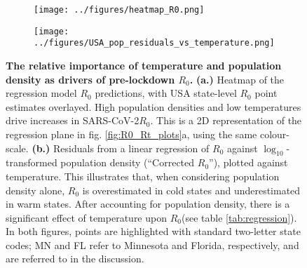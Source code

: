 \documentclass[12pt,english,a4paper]{article}
\newcommand{\virus}{SARS-CoV-2\xspace}
\newcommand{\RO}{$R_0$\xspace}
\begin{document}
\begin{figure}[ht]
\begin{subfigure}{.5\textwidth}
  \centering
  \texttt{[image: ../figures/heatmap\_R0.png]}  
  \caption{}
\end{subfigure}
\begin{subfigure}{.5\textwidth}
  \centering
  \texttt{[image: ../figures/USA\_pop\_residuals\_vs\_temperature.png]}  
  \caption{}
\end{subfigure}
  \caption{ {\bf The relative importance of temperature and population density as drivers of pre-lockdown \RO.}
  {\bf (a.)} Heatmap of the regression model \RO predictions, with USA state-level \RO point estimates overlayed. High population densities and low temperatures drive increases in \virus \RO. This is a 2D representation of the regression plane in fig. \ref{fig:R0_Rt_plots}a, using the same colour-scale.
  {\bf (b.)} Residuals from a linear regression of \RO against $\log_{10}$-transformed population density (``Corrected \RO''), plotted against temperature. This illustrates that, when considering population density alone, \RO is overestimated in cold states and underestimated in warm states. After accounting for population density, there is a significant
  effect of temperature upon \RO (see table \ref{tab:regression}). In both figures, points are highlighted with standard two-letter state codes; MN and FL refer to Minnesota and Florida, respectively, and are referred to in the discussion.}
\label{fig:USA_residuals}
\end{figure}
\end{document}
